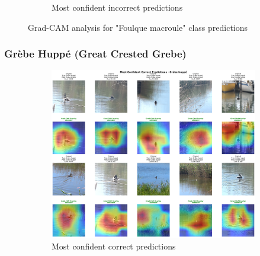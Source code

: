 \documentclass[12pt,a4paper]{article}
\begin{document}
\begin{figure}[H]
\begin{subfigure}[b]{0.45\textwidth}
        \caption{Most confident incorrect predictions}  
        \label{fig:foulque_incorrect}
    \end{subfigure}
    \caption{Grad-CAM analysis for "Foulque macroule" class predictions}
    \label{fig:foulque_gradcam}
\end{figure}

\subsubsection{Grèbe Huppé (Great Crested Grebe)}

\begin{figure}[H]
    \centering
    \begin{subfigure}[b]{0.45\textwidth}
        \centering
        \includegraphics[width=\textwidth]{../../output/gradcam_best_model_analysis_20250615_172003/class_analysis/Grèbe_huppé_correct.png}
        \caption{Most confident correct predictions}
        \label{fig:grebe_correct}
    \end{subfigure}
    \hfill
    \begin{subfigure}[b]{0.45\textwidth}
        \centering

\end{subfigure}
\end{figure}
\end{document}
